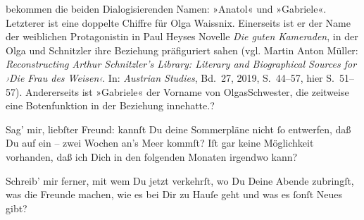 {{{{                     bekommen die beiden Dialogisierenden Namen: »Anatol« und »Gabriele«. Letzterer
                     ist eine doppelte Chiffre für Olga
                        Waissnix. Einerseits ist er der Name der weiblichen Protagonistin in
                        Paul Heyses Novelle \emph{Die guten Kameraden}, in der Olga und Schnitzler ihre Beziehung präfiguriert sahen (vgl. Martin Anton
                        Müller: \emph{Reconstructing Arthur Schnitzler’s Library:
                           Literary and Biographical Sources for ›Die Frau des Weisen‹}. In:
                           \emph{Austrian Studies}, Bd. 27, 2019, S. 44–57, hier S. 51–57). Andererseits ist
                     »Gabriele« der Vorname von OlgasSchwester, die
                     zeitweise eine Botenfunktion in der Beziehung innehatte.}}}\label{K_L02668-17}}?\pend
           
\pstart
           Sag’ mir, liebſter Freund: kannſt Du deine  Sommerpläne nicht{ }ſo entwerfen, daß Du auf ein – zwei Wochen an’s Meer kommſt?
               Iſt gar keine Möglichkeit vorhanden, daß ich Dich in \introOben{}den\introOben{}
               folgenden Monaten irgendwo \label{K_L02668-18v}\label{K_L02668-18}
               kann?\pend
           
\pstart
           Schreib’ mir ferner, mit wem Du jetzt verkehrſt, wo Du Deine Abende zubringſt, was
                  {\pb}die Freunde machen, wie es bei Dir zu Hauſe geht
               und was es{ }ſonſt Neues gibt?\pend
           
